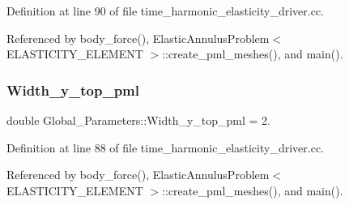 Definition at line 90 of file time\+\_\+harmonic\+\_\+elasticity\+\_\+driver.\+cc.



Referenced by body\+\_\+force(), Elastic\+Annulus\+Problem$<$ E\+L\+A\+S\+T\+I\+C\+I\+T\+Y\+\_\+\+E\+L\+E\+M\+E\+N\+T $>$\+::create\+\_\+pml\+\_\+meshes(), and main().

\mbox{\label{namespaceGlobal__Parameters_a175759402c54bb216b0599c6a031abea}} 
\subsubsection{\texorpdfstring{Width\+\_\+y\+\_\+top\+\_\+pml}{Width\_y\_top\_pml}}
{\footnotesize\ttfamily double Global\+\_\+\+Parameters\+::\+Width\+\_\+y\+\_\+top\+\_\+pml = 2.}



Definition at line 88 of file time\+\_\+harmonic\+\_\+elasticity\+\_\+driver.\+cc.



Referenced by body\+\_\+force(), Elastic\+Annulus\+Problem$<$ E\+L\+A\+S\+T\+I\+C\+I\+T\+Y\+\_\+\+E\+L\+E\+M\+E\+N\+T $>$\+::create\+\_\+pml\+\_\+meshes(), and main().

